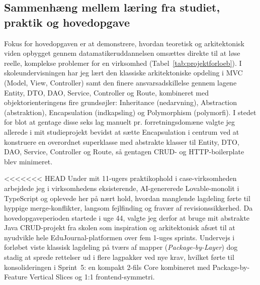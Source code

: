 \documentclass[11pt,a4paper]{article}
\begin{document}
\subsection{Sammenhæng mellem læring fra studiet, praktik og hovedopgave}
Fokus for hovedopgaven er at demonstrere, hvordan teoretisk og arkitektonisk viden opbygget gennem datamatikeruddannelsen omsættes direkte til at løse reelle, komplekse problemer for en virksomhed (Tabel~\ref{tab:projektforloeb}). I skoleundervisningen har jeg lært den klassiske arkitektoniske opdeling i MVC (Model, View, Controller) samt den finere ansvarsadskillelse gennem lagene Entity, DTO, DAO, Service, Controller og Route, kombineret med objektorienteringens fire grundsøjler: Inheritance (nedarvning), Abstraction (abstraktion), Encapsulation (indkapsling) og Polymorphism (polymorfi). I stedet for blot at gentage disse seks lag manuelt pr. forretningsdomæne valgte jeg allerede i mit studieprojekt bevidst at sætte Encapsulation i centrum ved at konstruere en overordnet superklasse med abstrakte klasser til Entity, DTO, DAO, Service, Controller og Route, så gentagen CRUD- og HTTP-boilerplate blev minimeret.

<<<<<<< HEAD
Under mit 11-ugers praktikophold i case-virksomheden arbejdede jeg i virksomhedens eksisterende, AI-genererede Lovable-monolit i TypeScript og oplevede her på nært hold, hvordan manglende lagdeling førte til hyppige merge-konflikter, langsom fejlfinding og fravær af revisionssikkerhed. Da hovedopgaveperioden startede i uge 44, valgte jeg derfor at bruge mit abstrakte Java CRUD-projekt fra skolen som inspiration og arkitektonisk afsæt til at nyudvikle hele EduJournal-platformen over fem 1-uges sprints. Undervejs i forløbet viste klassisk lagdeling på tværs af mapper (\textit{Package-by-Layer}) dog stadig at sprede rettelser ud i flere lagpakker ved nye krav, hvilket førte til konsolideringen i Sprint~5: en kompakt 2-fils Core kombineret med Package-by-Feature Vertical Slices og 1:1 frontend-symmetri.
\end{document}
